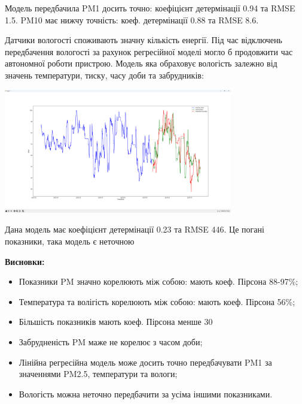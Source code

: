 \documentclass{article}
\begin{document}
Модель передбачила PM1 досить точно: коефіцієнт детермінації 0.94 та RMSE 1.5. PM10 має нижчу точність: коеф. детермінації 0.88 та RMSE 8.6.\\\indent

Датчики вологості споживають значну кількість енергії. Під час відключень передбачення вологості за рахунок регресійної моделі могло б продовжити час автономної роботи пристрою. Модель яка обраховує вологість залежно від значень температури, тиску, часу доби та забрудників:\\\indent
\begin{center}
    \includegraphics[width=100mm]{humidity}
\end{center}

Дана модель має коефіцієнт детермінації 0.23 та RMSE 446. Це погані показники, така модель є неточною\\\indent


\newpage

\textbf{Висновки:}\\\indent
\begin{itemize}
	\item Показники PM значно корелюють між собою: мають коеф. Пірсона 88-97\%;
	\item Температура та волігість корелюють між собою: мають коеф. Пірсона 56\%;
	\item Більшість показників мають коеф. Пірсона менше 30%
	\item Забрудненість PM маже не корелює з часом доби;
	\item Лінійна регресійна модель може досить точно передбачувати PM1 за значеннями PM2.5, температури та вологи;
	\item Вологість можна неточно передбачити за усіма іншими показниками.
\end{itemize}
\end{document}
